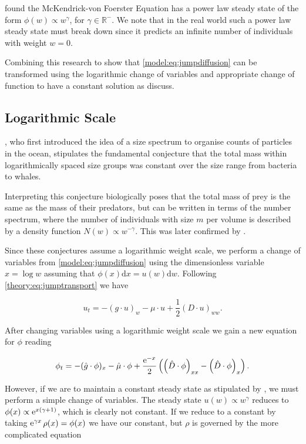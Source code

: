 \documentclass[../main]{subfiles}
\begin{document}
  \cite{benoit2004} found the McKendrick-von Foerster Equation has a power law steady state of the form $\phi(w) \propto w^{\gamma}$, for $\gamma \in \mathbb{R}^-$. We note that in the real world such a power law steady state must break down since it predicts an infinite number of individuals with weight $w = 0$.

  Combining this research to show that \autoref{model:eq:jumpdiffusion} can be transformed using the logarithmic change of variables and appropriate change of function to have a constant solution as \cite{benoit2004} discuss.

  \subsection{Logarithmic Scale}
  \cite{sheldon1967}, who first introduced the idea of a size spectrum to organise counts of particles in the ocean, stipulates the fundamental conjecture that the total mass within logarithmically spaced size groups was constant over the size range from bacteria to whales.

  Interpreting this conjecture biologically \cite{silvert1980} poses that the total mass of prey is the same as the mass of their predators, but can be written in terms of the number spectrum, where the number of individuals with size $m$ per volume is described by a density function $N(w) \propto w^{-\gamma}$. This was later confirmed by \cite{benoit2004}.

  Since these conjectures assume a logarithmic weight scale, we perform a change of variables from \autoref{model:eq:jumpdiffusion} using the dimensionless variable $x = \log{w}$ assuming that $\phi(x) \mathrm{d}x = u(w) \mathrm{d}w$. Following \autoref{theory:eq:jumptransport} we have

  \begin{equation}
    u_t = - (g \cdot u)_w - \mu \cdot u + \frac{1}{2} (D \cdot u)_{ww}.
  \end{equation}

  After changing variables using a logarithmic weight scale we gain a new equation for $\phi$ reading

  \begin{equation} \label{model:eq:logscale}
    \phi_t = - (\hat{g} \cdot \phi)_x - \hat{\mu} \cdot \phi + \frac{\operatorname{e}^{-x}}{2} \left( \left( \hat{D} \cdot \phi \right)_{xx} - \left( \hat{D} \cdot \phi \right)_x \right).
  \end{equation}

  However, if we are to maintain a constant steady state as stipulated by \cite{sheldon1967}, we must perform a simple change of variables. The steady state $u(w) \propto w^{\gamma}$ reduces to $\phi(x) \propto \operatorname{e}^{x(\gamma +1)}$, which is clearly not constant. If we reduce to a constant by taking $\operatorname{e}^{\gamma x} \rho(x) = \phi(x)$ we have our constant, but $\rho$ is governed by the more complicated equation
\end{document}
